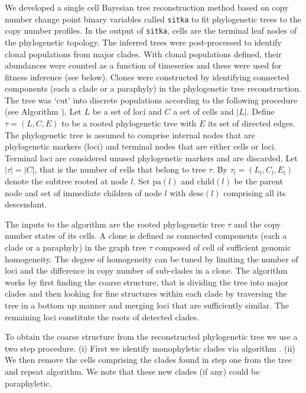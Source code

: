 We developed a single cell Bayesian tree reconstruction method based on copy number change point binary variables called \texttt{sitka} \cite{dorri2020efficient} to fit phylogenetic trees to the copy number profiles.  
In the output of \texttt{sitka}, cells are the terminal leaf nodes of the phylogenetic topology.  
The inferred trees were post-processed to identify clonal populations from major clades. With clonal populations defined, their abundances were counted as a function of timeseries and these were used for fitness inference (see below). 
Clones were constructed by identifying connected components (each a clade or a paraphyly) in the phylogenetic tree reconstruction. The tree was `cut' into discrete populations according to the following procedure (see Algorithm \cite{salehi2020single}).
Let $L$ be a set of loci and $C$ a set of cells and ${\lvert}L{\rvert}$. 
Define $\tau = (L, C, E)$ to be a rooted phylogenetic tree with $E$ its set of directed edges.
The phylogenetic tree is assumed to comprise internal nodes that are phylogenetic markers (loci) and terminal nodes that are either cells or loci. 
Terminal loci are considered unused phylogenetic markers and are discarded. 
Let ${\lvert}\tau{\rvert} = {\lvert}C{\rvert}$, that is the number of cells that belong to tree $\tau$.
By $\tau_{l} = (L_l, C_l, E_l)$ denote the subtree rooted at node $l$.
Set $\text{pa}(l)$ and $\text{child}(l)$ be the parent node and set of immediate children of node $l$ with $\text{desc}(l)$ comprising all its descendant. 

The inputs to the algorithm are the rooted phylogenetic tree $\tau$ and the copy number states of its cells.
A clone is defined as connected components (each a clade or a paraphyly) in the graph tree $\tau$ composed of cell of sufficient genomic homogeneity. 
The degree of homogeneity can be tuned by limiting the number of loci and the difference in copy number of sub-clades in a clone. 
The algorithm works by first finding the coarse structure, that is dividing the tree into major clades and then looking for fine structures within each clade by traversing the tree in a bottom up manner and merging loci that are sufficiently similar.
The remaining loci constitute the roots of detected clades.

To obtain the coarse structure from the reconstructed phylogenetic tree we use a two step procedure. (i) First we identify monophyletic clades via algorithm \cite{salehi2020single}. 
(ii) We then remove the cells comprising the clades found in step one from the tree and repeat algorithm. 
We note that these new clades (if any) could be paraphyletic.


